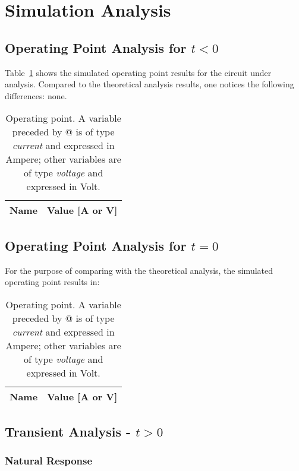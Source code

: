 \section{Simulation Analysis}
\label{sec:simulation}

\subsection{Operating Point Analysis for $t<0$}

Table~\ref{tab:op} shows the simulated operating point results for the circuit
under analysis. Compared to the theoretical analysis results, one notices the
following differences: none.

\begin{table}[h]
  \centering
  \begin{tabular}{|l|r|}
    \hline
    {\bf Name} & {\bf Value [A or V]} \\ \hline
    
  \end{tabular}
  \caption{Operating point. A variable preceded by @ is of type {\em current}
    and expressed in Ampere; other variables are of type {\it voltage} and expressed in
    Volt.}
  \label{tab:op}
\end{table}

\subsection{Operating Point Analysis for $t=0$}

For the purpose of comparing with the theoretical analysis, the simulated operating point results in:
\newpage
\begin{table}[h]
  \centering
  \begin{tabular}{|l|r|}
    \hline
    {\bf Name} & {\bf Value [A or V]} \\ \hline
    
\end{tabular}
  \caption{Operating point. A variable preceded by @ is of type {\em current}
    and expressed in Ampere; other variables are of type {\it voltage} and expressed in
    Volt.}
  \label{tab:op2}
\end{table}




\subsection{Transient Analysis - $t>0$}
\subsubsection{Natural Response}

